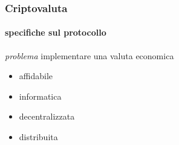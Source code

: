 \begin{frame}

	\frametitle{Criptovaluta}
	\framesubtitle{specifiche sul protocollo}
	
	\textit{problema} \vspace{5pt}
	\newline implementare una {\color{blue}valuta} economica
	\begin{itemize}
	  \item affidabile
	  \item informatica
	  \item decentralizzata %
	  \item distribuita %
	\end{itemize}

\end{frame}
